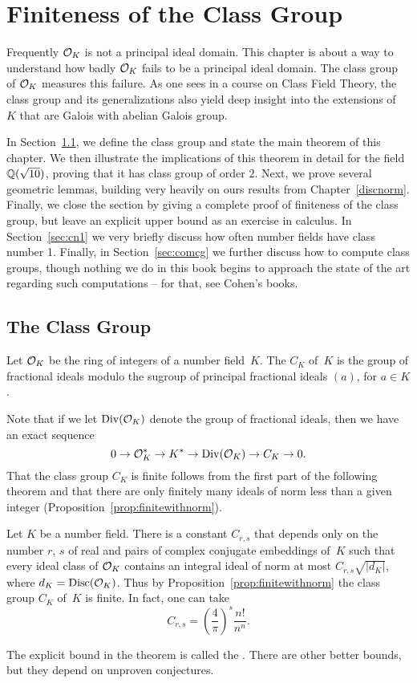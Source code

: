 \chapter{Finiteness of the Class Group}\label{ch:classgroup}
Frequently $\mathcal{O}_K$ is not a principal ideal domain.  This chapter is
about a way to understand how badly $\mathcal{O}_K$ fails to be a principal
ideal domain.  The class group of $\mathcal{O}_K$ measures this failure.  As
one sees in a course on Class Field Theory, the class group and its
generalizations also yield deep insight into the 
extensions of~$K$ that are Galois with abelian Galois group.

In Section~\ref{sec:theclassgroup}, we define the class group and
state the main theorem of this chapter.  We then illustrate the
implications of this theorem in detail for the field $\mathbb{Q}(\sqrt{10})$,
proving that it has class group of order $2$. Next, we prove several
geometric lemmas, building very heavily on ours results from
Chapter~\ref{discnorm}.  Finally, we close the section by giving a
complete proof of finiteness of the class group, but leave an explicit
upper bound as an exercise in calculus.  In Section~\ref{sec:cn1} we
very briefly discuss how often number fields have class number 1.
Finally, in Section~\ref{sec:comcg} we further discuss how to compute
class groups, though nothing we do in this book begins to approach the
state of the art regarding such computations -- for that, see Cohen's
books.

\section{The Class Group}\label{sec:theclassgroup}
\begin{definition}
Let $\mathcal{O}_K$ be the ring of integers of a number field~$K$.  The 
 $C_K$ of~$K$ is the group of fractional ideals
modulo the sugroup of principal fractional ideals $(a)$, for $a\in K$.
\end{definition}

Note that if we let $\operatorname{Div}(\mathcal{O}_K)$ denote the group of  fractional
ideals, then we have an exact sequence
$$
  0 \to \mathcal{O}_K^* \to K^* \to \operatorname{Div}(\mathcal{O}_K) \to C_K \to 0.
$$
That the class group $C_K$ is finite follows from the first part of
the following theorem and that there are only finitely many
ideals of norm less than a given integer (Proposition~\ref{prop:finitewithnorm}).
\begin{theorem}\label{thm:finiteclassgrp}
Let $K$ be a number field.  There is a constant $C_{r,s}$ that
depends only on the number $r$, $s$ of real and pairs
of complex conjugate embeddings of~$K$ such that
every ideal class of $\mathcal{O}_K$ contains an integral ideal
of norm at most $C_{r,s}\sqrt{|d_K|}$, where
$d_K=\operatorname{Disc}(\mathcal{O}_K)$.
Thus by Proposition~\ref{prop:finitewithnorm} 
the class group $C_K$ of~$K$ is
finite.
In fact, one can take
$$C_{r,s} = \left(\frac{4}{\pi}\right)^s\frac{n!}{n^n}.$$
\end{theorem}
The explicit bound in the theorem is called the .  There are other better bounds, but they depend on unproven
conjectures.

